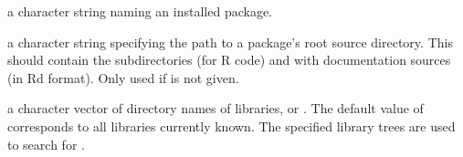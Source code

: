 %
\begin{Arguments}
\begin{ldescription}
\item[\code{package}] a character string naming an installed package.
\item[\code{dir}] a character string specifying the path to a package's root
source directory.  This should contain the subdirectories 
(for R code) and  with \R{} documentation sources (in Rd
format).  Only used if  is not given.
\item[\code{lib.loc}] a character vector of directory names of \R{} libraries,
or .  The default value of  corresponds to all
libraries currently known.  The specified library trees are used to
search for .
\end{ldescription}
\end{Arguments}
%
